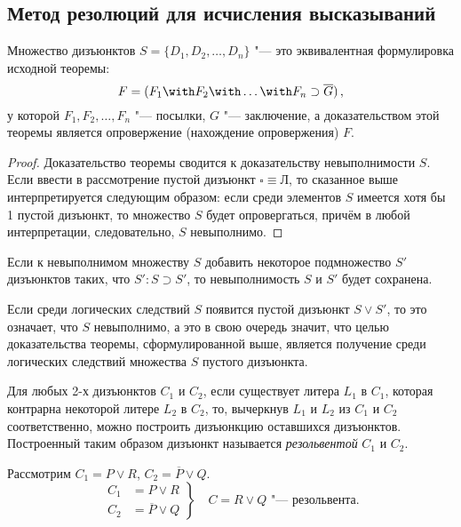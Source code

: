 \subsection{Метод резолюций для исчисления высказываний}

\begin{theorem} Множество дизъюнктов $S=\{D_1,D_2,\dots,D_n\}$ "--- это
эквивалентная формулировка исходной теоремы:
  $$F = (F_1 \with F_2 \with \ldots \with F_n \supset \overline{G})\,,$$
  у которой $F_1,F_2,\ldots,F_n$ "--- посылки, $G$ "--- заключение, а
доказательством этой теоремы является опровержение (нахождение
опровержения) $F$.
\end{theorem}

\begin{proof} Доказательство теоремы сводится к доказательству
невыполнимости $S$. Если ввести в рассмотрение пустой дизъюнкт
$\square \equiv Л$, то сказанное выше интерпретируется следующим
образом: если среди элементов $S$ имеется хотя бы 1 пустой дизъюнкт,
то множество $S$ будет опровергаться, причём в любой интерпретации,
следовательно, $S$ невыполнимо.
\end{proof}

Если к невыполнимом множеству $S$ добавить некоторое подмножество $S'$
дизъюнктов таких, что $S'\colon S \supset S'$, то невыполнимость $S$ и
$S'$ будет сохранена.

Если среди логических следствий $S$ появится пустой дизъюнкт $S \lor
S'$, то это означает, что $S$ невыполнимо, а это в свою очередь
значит, что целью доказательства теоремы, сформулированной выше,
является получение среди логических следствий множества $S$ пустого
дизъюнкта.

\begin{defin}[резольвенты] Для любых 2-х дизъюнктов $C_1$ и $C_2$,
если существует литера $L_1$ в $C_1$, которая контрарна некоторой
литере $L_2$ в $C_2$, то, вычеркнув $L_1$ и $L_2$ из $C_1$ и $C_2$
соответственно, можно построить дизъюнкцию оставшихся
дизъюнктов. Построенный таким образом дизъюнкт называется
\emph{резольвентой} $C_1$ и $C_2$.
\end{defin}

\begin{ex} Рассмотрим $C_1=P\lor{}R$, $C_2=\overline{P}\lor{}Q$.
  $$ \left.
  \begin{aligned} C_1 &= P \lor R\\ C_2 &= \overline{P} \lor Q
  \end{aligned} \right\} \quad C = R \lor Q\text{ "--- резольвента.}
  $$
\end{ex}

